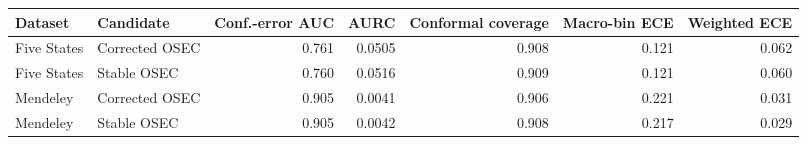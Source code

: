 \begin{tabular}{llrrrrr}
\toprule
Dataset & Candidate & Conf.-error AUC & AURC & Conformal coverage & Macro-bin ECE & Weighted ECE \\
\midrule
Five States & Corrected OSEC & 0.761 & 0.0505 & 0.908 & 0.121 & 0.062 \\
Five States & Stable OSEC & 0.760 & 0.0516 & 0.909 & 0.121 & 0.060 \\
Mendeley & Corrected OSEC & 0.905 & 0.0041 & 0.906 & 0.221 & 0.031 \\
Mendeley & Stable OSEC & 0.905 & 0.0042 & 0.908 & 0.217 & 0.029 \\
\bottomrule
\end{tabular}
